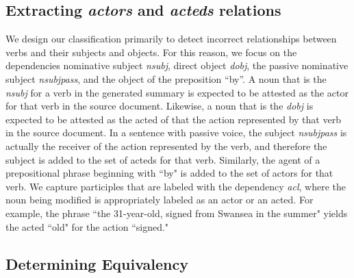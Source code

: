 \documentclass{article}
\begin{document}


\subsection{Extracting \textit{actors} and \textit{acteds} relations}

We design our classification primarily to detect incorrect relationships between verbs and their subjects and objects. For this reason, we focus on the dependencies nominative subject \textit{nsubj}, direct object \textit{dobj}, the passive nominative subject \textit{nsubjpass}, and the object of the preposition ``by''. A noun that is the \textit{nsubj} for a verb in the generated summary is expected to be attested as the actor for that verb in the source document. Likewise, a noun that is the \textit{dobj} is expected to be attested as the acted of that the action represented by that verb in the source document. In a sentence with passive voice, the subject \textit{nsubjpass} is actually the receiver of the action represented by the verb, and therefore the subject is added to the set of acteds for that verb. Similarly, the agent of a prepositional phrase beginning with ``by" is added to the set of actors for that verb. We capture participles that are labeled with the dependency \textit{acl}, where the noun being modified is appropriately labeled as an actor or an acted. For example, the phrase ``the 31-year-old, signed from Swansea in the summer" yields the acted ``old" for the action ``signed."

\subsection{Determining Equivalency}
\end{document}
